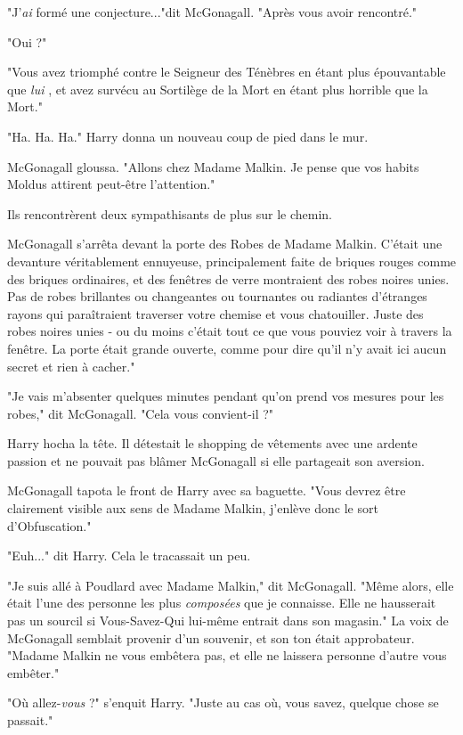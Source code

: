 "J'\emph{ai}  formé une conjecture..."dit McGonagall. "Après vous avoir rencontré."

"Oui ?"

"Vous avez triomphé contre le Seigneur des Ténèbres en étant plus épouvantable que \emph{lui} , et avez survécu au Sortilège de la Mort en étant plus horrible que la Mort."

"Ha. Ha. Ha." Harry donna un nouveau coup de pied dans le mur.

McGonagall gloussa. "Allons chez Madame Malkin. Je pense que vos habits Moldus attirent peut-être l'attention."

Ils rencontrèrent deux sympathisants de plus sur le chemin.

McGonagall s'arrêta devant la porte des Robes de Madame Malkin. C'était une devanture véritablement ennuyeuse, principalement faite de briques rouges comme des briques ordinaires, et des fenêtres de verre montraient des robes noires unies. Pas de robes brillantes ou changeantes ou tournantes ou radiantes d'étranges rayons qui paraîtraient traverser votre chemise et vous chatouiller. Juste des robes noires unies - ou du moins c'était tout ce que vous pouviez voir à travers la fenêtre. La porte était grande ouverte, comme pour dire qu'il n'y avait ici aucun secret et rien à cacher."

"Je vais m'absenter quelques minutes pendant qu'on prend vos mesures pour les robes," dit McGonagall. "Cela vous convient-il ?"

Harry hocha la tête. Il détestait le shopping de vêtements avec une ardente passion et ne pouvait pas blâmer McGonagall si elle partageait son aversion.

McGonagall tapota le front de Harry avec sa baguette. "Vous devrez être clairement visible aux sens de Madame Malkin, j'enlève donc le sort d'Obfuscation."

"Euh..." dit Harry. Cela le tracassait un peu.

"Je suis allé à Poudlard avec Madame Malkin," dit McGonagall. "Même alors, elle était l'une des personne les plus \emph{composées}  que je connaisse. Elle ne hausserait pas un sourcil si Vous-Savez-Qui lui-même entrait dans son magasin." La voix de McGonagall semblait provenir d'un souvenir, et son ton était approbateur. "Madame Malkin ne vous embêtera pas, et elle ne laissera personne d'autre vous embêter."

"Où allez-\emph{vous}  ?" s'enquit Harry. "Juste au cas où, vous savez, quelque chose se passait."


